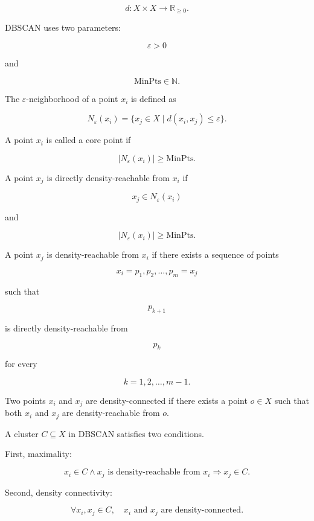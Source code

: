 \documentclass[a4paper]{article}
\begin{document}
      \[
      d : X \times X \rightarrow \mathbb{R}_{\geq 0}.
      \]

      DBSCAN uses two parameters:

      \[
      \varepsilon > 0
      \]

      and

      \[
      \mathrm{MinPts} \in \mathbb{N}.
      \]

      The \(\varepsilon\)-neighborhood of a point \(x_i\) is defined as

      \[
      N_{\varepsilon}(x_i)
      =
      \{x_j \in X \mid d(x_i, x_j) \leq \varepsilon\}.
      \]

      A point \(x_i\) is called a core point if

      \[
      |N_{\varepsilon}(x_i)| \geq \mathrm{MinPts}.
      \]

      A point \(x_j\) is directly density-reachable from \(x_i\) if

      \[
      x_j \in N_{\varepsilon}(x_i)
      \]

      and

      \[
      |N_{\varepsilon}(x_i)| \geq \mathrm{MinPts}.
      \]

      A point \(x_j\) is density-reachable from \(x_i\) if there exists a sequence of points

      \[
      x_i = p_1, p_2, \dots, p_m = x_j
      \]

      such that

      \[
      p_{k+1}
      \]

      is directly density-reachable from

      \[
      p_k
      \]

      for every

      \[
      k = 1, 2, \dots, m-1.
      \]

      Two points \(x_i\) and \(x_j\) are density-connected if there exists a point \(o \in X\) such that both \(x_i\) and \(x_j\) are density-reachable from \(o\).

      A cluster \(C \subseteq X\) in DBSCAN satisfies two conditions.

      First, maximality:

      \[
      x_i \in C
      \land
      x_j \text{ is density-reachable from } x_i
      \Rightarrow
      x_j \in C.
      \]

      Second, density connectivity:

      \[
      \forall x_i, x_j \in C,
      \quad
      x_i \text{ and } x_j \text{ are density-connected}.
      \]
\end{document}
